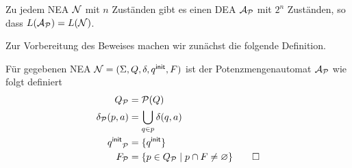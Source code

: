 \begin{Satz}\label{satz:2.rabinscott}
	Zu jedem \ac{NEA} $\mathcal{N}$ mit $n$ Zuständen gibt es einen \ac{DEA} $\mathcal{A}_{\mathcal{P}}$ mit $2^n$ Zuständen, so dass $L(\mathcal{A}_{\mathcal{P}})=L(\mathcal{N})$.
\end{Satz}
  Zur Vorbereitung des Beweises machen wir zunächst die folgende Definition.

\begin{Def}[Potenzmengenautomat]
 Für gegebenen \ac{NEA}  $\mathcal{N}= (\Sigma, Q,\delta,{q^\mathsf{init}},F)$ ist der Potenzmengenautomat $\mathcal{A}_{\mathcal{P}}$ wie folgt definiert
         \begin{align*}
                Q_{\mathcal{P}} &= \mathcal{P}(Q)\\
                \delta_{\mathcal{P}}(p,a) &= \bigcup_{q\in p} \delta(q,a)\\
                {q^\mathsf{init}}_{\mathcal{P}} &= \{{q^\mathsf{init}}\}\\
                F_{\mathcal{P}} &= \{ p\in Q_{\mathcal{P}} \mid p\cap F\neq \varnothing \}\qedhere
        \end{align*}
\end{Def}
